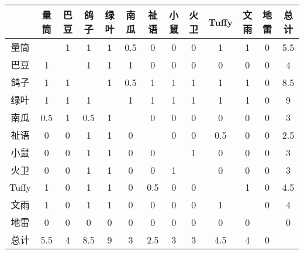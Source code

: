 \documentclass[12pt]{article}
\begin{document}
\begin{table}
\centering
\begin{tabular}{c|*{12}{c}}
 & 量筒 & 巴豆 & 鸽子 & 绿叶 & 南瓜 & 祉语 & 小鼠 & 火卫 & Tuffy & 文雨 & 地雷 & 总计 \\
\hline
量筒 & & 1 & 1 & 1 & 0.5 & 0 & 0 & 0 & 1 & 1 & 0 & 5.5 \\
巴豆 & 1 & & 1 & 1 & 1 & 0 & 0 & 0 & 0 & 0 & 0 & 4 \\
鸽子 & 1 & 1 & & 1 & 0.5 & 1 & 1 & 1 & 1 & 1 & 0 & 8.5 \\
绿叶 & 1 & 1 & 1 & & 1 & 1 & 1 & 1 & 1 & 1 & 0 & 9 \\
南瓜 & 0.5 & 1 & 0.5 & 1 & & 0 & 0 & 0 & 0 & 0 & 0 & 3 \\
祉语 & 0 & 0 & 1 & 1 & 0 & & 0 & 0 & 0.5 & 0 & 0 & 2.5 \\
小鼠 & 0 & 0 & 1 & 1 & 0 & 0 & & 1 & 0 & 0 & 0 & 3 \\
火卫 & 0 & 0 & 1 & 1 & 0 & 0 & 1 & & 0 & 0 & 0 & 3 \\
Tuffy & 1 & 0 & 1 & 1 & 0 & 0.5 & 0 & 0 & & 1 & 0 & 4.5 \\
文雨 & 1 & 0 & 1 & 1 & 0 & 0 & 0 & 0 & 1 & & 0 & 4 \\
地雷 & 0 & 0 & 0 & 0 & 0 & 0 & 0 & 0 & 0 & 0 & & 0 \\
总计 & 5.5 & 4 & 8.5 & 9 & 3 & 2.5 & 3 & 3 & 4.5 & 4 & 0 & \\
\end{tabular}
\end{table}
\end{document}
